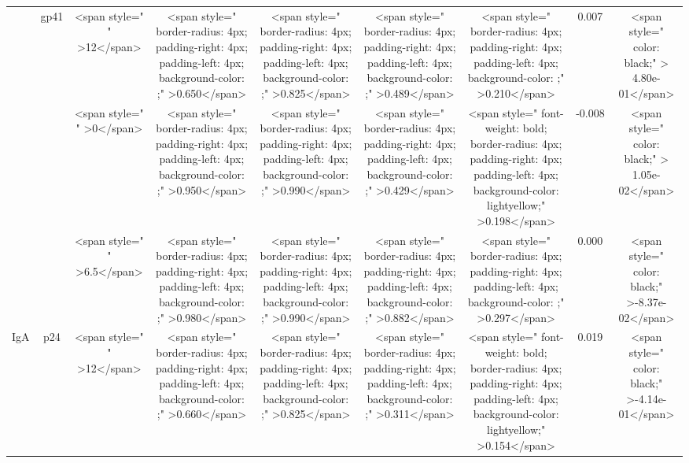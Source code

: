 \begin{tabular}{c|c|c|c|c|c|c|c|c}
\cline{3-9}
 & \multirow{-3}{*}{\centering\arraybackslash gp41} & <span style="     " >12</span> & <span style="     border-radius: 4px; padding-right: 4px; padding-left: 4px; background-color: ;" >0.650</span> & <span style="     border-radius: 4px; padding-right: 4px; padding-left: 4px; background-color: ;" >0.825</span> & <span style="     border-radius: 4px; padding-right: 4px; padding-left: 4px; background-color: ;" >0.489</span> & <span style="     border-radius: 4px; padding-right: 4px; padding-left: 4px; background-color: ;" >0.210</span> & 0.007 & <span style="     color: black;" > 4.80e-01</span>\\
\cline{2-9}
 &  & <span style="     " >0</span> & <span style="     border-radius: 4px; padding-right: 4px; padding-left: 4px; background-color: ;" >0.950</span> & <span style="     border-radius: 4px; padding-right: 4px; padding-left: 4px; background-color: ;" >0.990</span> & <span style="     border-radius: 4px; padding-right: 4px; padding-left: 4px; background-color: ;" >0.429</span> & <span style=" font-weight: bold;    border-radius: 4px; padding-right: 4px; padding-left: 4px; background-color: lightyellow;" >0.198</span> & -0.008 & <span style="     color: black;" > 1.05e-02</span>\\
\cline{3-9}
 &  & <span style="     " >6.5</span> & <span style="     border-radius: 4px; padding-right: 4px; padding-left: 4px; background-color: ;" >0.980</span> & <span style="     border-radius: 4px; padding-right: 4px; padding-left: 4px; background-color: ;" >0.990</span> & <span style="     border-radius: 4px; padding-right: 4px; padding-left: 4px; background-color: ;" >0.882</span> & <span style="     border-radius: 4px; padding-right: 4px; padding-left: 4px; background-color: ;" >0.297</span> & 0.000 & <span style="     color: black;" >-8.37e-02</span>\\
\cline{3-9}
\multirow{-6}{*}{\centering\arraybackslash IgA} & \multirow{-3}{*}{\centering\arraybackslash p24} & <span style="     " >12</span> & <span style="     border-radius: 4px; padding-right: 4px; padding-left: 4px; background-color: ;" >0.660</span> & <span style="     border-radius: 4px; padding-right: 4px; padding-left: 4px; background-color: ;" >0.825</span> & <span style="     border-radius: 4px; padding-right: 4px; padding-left: 4px; background-color: ;" >0.311</span> & <span style=" font-weight: bold;    border-radius: 4px; padding-right: 4px; padding-left: 4px; background-color: lightyellow;" >0.154</span> & 0.019 & <span style="     color: black;" >-4.14e-01</span>\\

\end{tabular}
